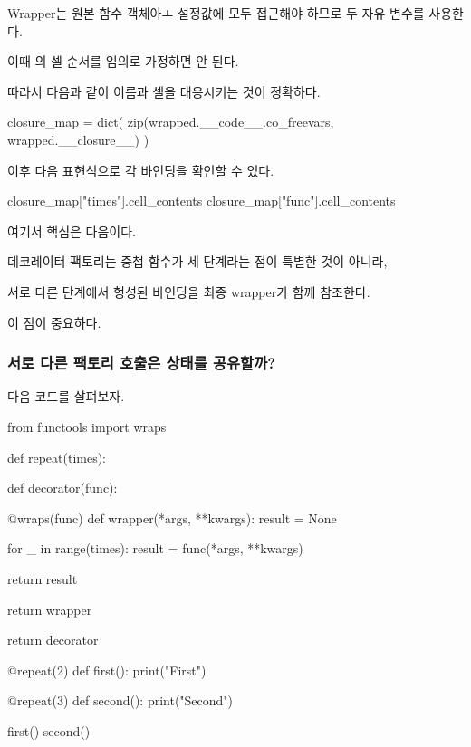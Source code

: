 Wrapper는 원본 함수 객체아ㅗ 설정값에 모두 접근해야 하므로 두 자유 변수를 사용한다.

이때 의 셀 순서를 임의로 가정하면 안 된다.

따라서 다음과 같이 이름과 셀을 대응시키는 것이 정확하다.

\begin{dhkcode}
closure_map = dict(
    zip(wrapped.__code__.co_freevars, wrapped.__closure__)
)
\end{dhkcode}

이후 다음 표현식으로 각 바인딩을 확인할 수 있다.

\begin{dhkcode}
closure_map["times"].cell_contents
closure_map["func"].cell_contents
\end{dhkcode}

여기서 핵심은 다음이다.

\begin{dhksmry}[centered]
데코레이터 팩토리는 중첩 함수가 세 단계라는 점이 특별한 것이 아니라,

서로 다른 단계에서 형성된 바인딩을 최종 wrapper가 함께 참조한다.
\end{dhksmry}

이 점이 중요하다.

\subsubsection{서로 다른 팩토리 호출은 상태를 공유할까?}

다음 코드를 살펴보자.

\begin{dhkcode}
from functools import wraps

def repeat(times):

    def decorator(func):

        @wraps(func)
        def wrapper(*args, **kwargs):
            result = None

            for _ in range(times):
                result = func(*args, **kwargs)

            return result

        return wrapper

    return decorator


@repeat(2)
def first():
    print("First")


@repeat(3)
def second():
    print("Second")


first()
second()
\end{dhkcode}


